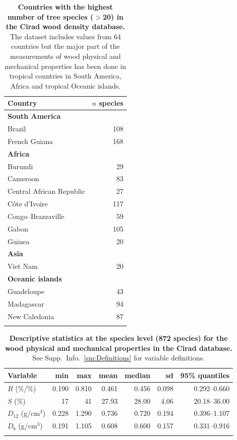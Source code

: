 \documentclass[a4paper, 12pt, leqno, dvipsnames]{article}\usepackage[]{graphicx}\usepackage[]{color}
\begin{document}


\vfill
  \begin{longtable}{@{}lr@{}} 
    \caption{\textbf{Countries with the highest number of tree species ($>$20) in the
      Cirad wood density database.} The dataset includes values from 64 countries but the major
    part of the measurements of wood physical and mechanical properties has been done in tropical
    countries in South America, Africa and tropical Oceanic islands.}\label{tab:Countries}\\
    \toprule
    Country & $n$ species \\
    \midrule
    \textbf{South America} & ~ \\ 
    Brazil & 108 \\
    French Guiana & 168 \\
    \textbf{Africa} & ~ \\
    Burundi & 29 \\
    Cameroon & 83 \\
    Central African Republic & 27 \\
    Côte d'Ivoire & 117 \\
    Congo--Brazzaville & 59 \\
    Gabon & 105 \\
    Guinea & 20 \\
    \textbf{Asia} & ~ \\
    Viet Nam & 20 \\
    \textbf{Oceanic islands} & ~ \\
    Guadeloupe & 43 \\
    Madagascar & 94 \\
    New Caledonia & 87 \\
    \bottomrule\\
  \end{longtable}
\vfill

\newpage

  \begin{longtable}{@{}lrrrrrr@{}} 
    \caption{\textbf{Descriptive statistics at the species level (872 species) for the
      wood physical and mechanical properties in the Cirad database.}
      See Supp.~Info.~\ref{sm:Definitions} for variable definitions.}\label{tab:Stat}\\
    \toprule
    Variable & min & max & mean & median & sd & 95\% quantiles \\
    \midrule
    $R$ (\%/\%) & 0.190 & 0.810 & 0.461 & 0.456 & 0.098 & 0.292--0.660 \\
    $S$ (\%) & 17 & 41 & 27.93 & 28.00 & 4.06 & 20.18--36.00 \\
    $D_{12}$ (g/cm$^3$) & 0.228 & 1.290 & 0.736 & 0.720 & 0.194 & 0.396--1.107 \\
    $D_b$ (g/cm$^3$) &  0.191 & 1.105 & 0.608 & 0.600 & 0.157 & 0.331--0.916 \\
    \bottomrule\\
  \end{longtable}
\end{document}
